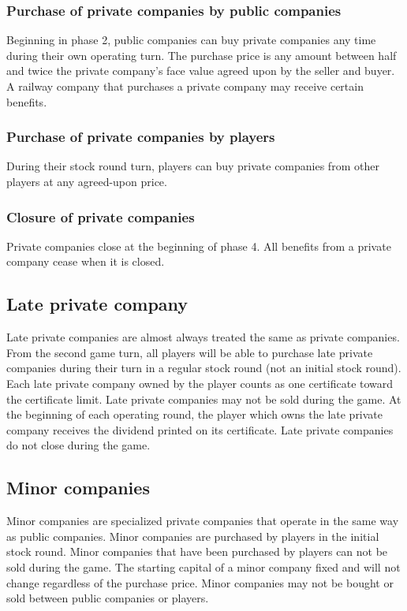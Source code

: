 \documentclass{article}
\begin{document}
\begin{CJK}{UTF8}{min}
\begin{multicols}{2}
\subsubsection{Purchase of private companies by public companies}
Beginning in phase 2, public companies can buy private companies
any time during their own operating turn. The purchase price is any
amount between half and twice the private company's face value agreed
upon by the seller and buyer.  A railway company that purchases a
private company may receive certain benefits.

\subsubsection{Purchase of private companies by players}
During their stock round turn, players can buy private companies from
other players at any agreed-upon price.

\subsubsection{Closure of private companies}
Private companies close at the beginning of phase 4. All benefits from
a private company cease when it is closed.

\subsection{Late private company}
Late private companies are almost always treated the same as private
companies. From the second game turn, all players will be able to
purchase late private companies during their turn in a regular stock
round (not an initial stock round). Each late private company owned by
the player counts as one certificate toward the certificate
limit. Late private companies may not be sold during the game. At the
beginning of each operating round, the player which owns the late
private company receives the dividend printed on its certificate. Late
private companies do not close during the game.

\subsection{Minor companies}
Minor companies are specialized private companies that operate in the
same way as public companies. Minor companies are purchased by players
in the initial stock round. Minor companies that have been purchased
by players can not be sold during the game. The starting capital of a
minor company fixed and will not change regardless of the purchase
price. Minor companies may not be bought or sold between public
companies or players.


\end{multicols}
\end{CJK}
\end{document}

